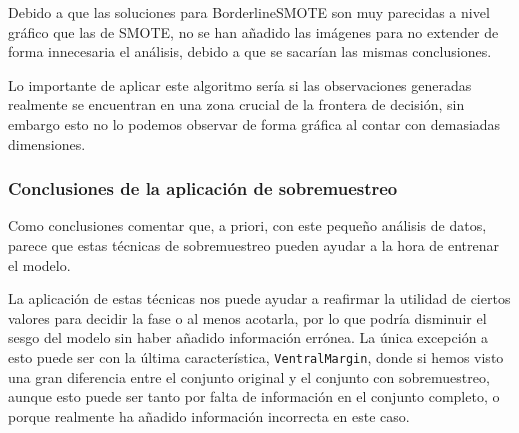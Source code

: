 Debido a que las soluciones para BorderlineSMOTE son muy parecidas a nivel gráfico que las de SMOTE, no se han añadido las imágenes para no extender de forma innecesaria el análisis, debido a que se sacarían las mismas conclusiones.

Lo importante de aplicar este algoritmo sería si las observaciones generadas realmente se encuentran en una zona crucial de la frontera de decisión, sin embargo esto no lo podemos observar de forma gráfica al contar con demasiadas dimensiones.

\subsubsection{Conclusiones de la aplicación de sobremuestreo}


Como conclusiones comentar que, a priori, con este pequeño análisis de datos, parece que estas técnicas de sobremuestreo pueden ayudar a la hora de entrenar el modelo.

La aplicación de estas técnicas nos puede ayudar a reafirmar la utilidad de ciertos valores para decidir la fase o al menos acotarla, por lo que podría disminuir el sesgo del modelo sin haber añadido información errónea. La única excepción a esto puede ser con la última característica, \texttt{VentralMargin}, donde si hemos visto una gran diferencia entre el conjunto original y el conjunto con sobremuestreo, aunque esto puede ser tanto por falta de información en el conjunto completo, o porque realmente ha añadido información incorrecta en este caso.



\newpage
